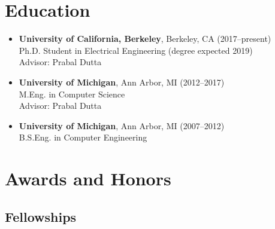 \documentclass{article}
\begin{document}
%
%
%




\section*{Education}

\begin{itemize}
  \item[]
    \textbf{University of California, Berkeley}, Berkeley, CA (2017--present) \\
    Ph.D. Student in Electrical Engineering (degree expected 2019) \\
    Advisor: Prabal Dutta

  \item[]
    \textbf{University of Michigan}, Ann Arbor, MI (2012--2017) \\
    M.Eng. in Computer Science \\
    Advisor: Prabal Dutta

  \item[]
    \textbf{University of Michigan}, Ann Arbor, MI (2007--2012) \\
    B.S.Eng. in Computer Engineering
\end{itemize}




\section*{Awards and Honors}

\subsection*{Fellowships}
\end{document}
